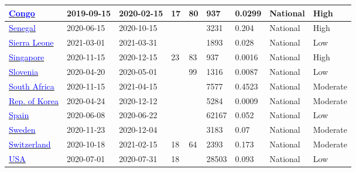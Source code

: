 \begin{table}[ht]
\begin{center}
\begin{tabular}{p{2cm} | p{1.6cm} | p{1.6cm} | p{0.8cm} | p{0.8cm} | p{1cm} | p{1.3cm} | p{1.2cm} | p{1.2cm}}
           \hline 
           \href{https://wwwnc.cdc.gov/eid/article/28/4/21-2476\_article}{\textcolor{blue}{Congo}} & 2019-09-15 & 2020-02-15 & 17 & 80 & 937 & 0.0299 & National & High \\ 
           \hline 
           \href{https://www.ncbi.nlm.nih.gov/pmc/articles/PMC8702669/}{\textcolor{blue}{Senegal}} & 2020-06-15 & 2020-10-15 &  &  & 3231 & 0.204 & National & High \\ 
           \hline 
           \href{https://gh.bmj.com/content/6/11/e007271}{\textcolor{blue}{Sierra Leone}} & 2021-03-01 & 2021-03-31 &  &  & 1893 & 0.028 & National & Low \\ 
           \hline 
           \href{https://papers.ssrn.com/sol3/papers.cfm?abstract\_id=3826194}{\textcolor{blue}{Singapore}} & 2020-11-15 & 2020-12-15 & 23 & 83 & 937 & 0.0016 & National & High \\ 
           \hline 
           \href{https://dx.doi.org/10.1016/j.cmi.2021.03.009}{\textcolor{blue}{Slovenia}} & 2020-04-20 & 2020-05-01 &  & 99 & 1316 & 0.0087 & National & Low \\ 
           \hline 
           \href{https://dx.doi.org/10.1093/cid/ciac198}{\textcolor{blue}{South Africa}} & 2020-11-15 & 2021-04-15 &  &  & 7577 & 0.4523 & National & Moderate \\ 
           \hline 
           \href{https://dx.doi.org/10.4178/epih.e2022028}{\textcolor{blue}{Rep. of Korea}} & 2020-04-24 & 2020-12-12 &  &  & 5284 & 0.0009 & National & Moderate \\ 
           \hline 
           \href{https://www.mscbs.gob.es/ciudadanos/ene-covid/docs/ESTUDIO\_ENE-COVID19\_INFORME\_FINAL.pdf}{\textcolor{blue}{Spain}} & 2020-06-08 & 2020-06-22 &  &  & 62167 & 0.052 & National & Low \\ 
           \hline 
           \href{https://www.folkhalsomyndigheten.se/contentassets/376f9021a4c84da08de18ac597284f0c/pavisning-antikroppar-genomgangen-covid-19-blodgivare-delrapport-2.pdf}{\textcolor{blue}{Sweden}} & 2020-11-23 & 2020-12-04 &  &  & 3183 & 0.07 & National & Moderate \\ 
           \hline 
           \href{https://dx.doi.org/10.1186/s12916-022-02431-z}{\textcolor{blue}{Switzerland}} & 2020-10-18 & 2021-02-15 & 18 & 64 & 2393 & 0.173 & National & Moderate \\ 
           \hline 
           \href{https://www.thelancet.com/journals/lancet/article/PIIS0140-6736(20)32009-2/fulltext}{\textcolor{blue}{USA}} & 2020-07-01 & 2020-07-31 & 18 &  & 28503 & 0.093 & National & Low \\ 

\end{tabular}
\end{center}
\end{table}
